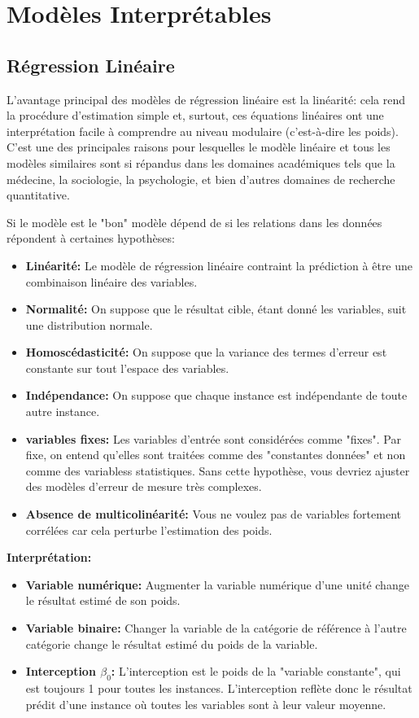 \section{Modèles Interprétables}

\subsection{Régression Linéaire}

L'avantage principal des modèles de régression linéaire est la linéarité: cela rend la procédure d'estimation simple et, surtout, ces équations linéaires ont une interprétation facile à comprendre au niveau modulaire (c'est-à-dire les poids). C'est une des principales raisons pour lesquelles le modèle linéaire et tous les modèles similaires sont si répandus dans les domaines académiques tels que la médecine, la sociologie, la psychologie, et bien d'autres domaines de recherche quantitative.

Si le modèle est le "bon" modèle dépend de si les relations dans les données répondent à certaines hypothèses:

\begin{itemize}
    \item \textbf{Linéarité:} Le modèle de régression linéaire contraint la prédiction à être une combinaison linéaire des variables.
    \item \textbf{Normalité:} On suppose que le résultat cible, étant donné les variables, suit une distribution normale.
    \item \textbf{Homoscédasticité:} On suppose que la variance des termes d'erreur est constante sur tout l'espace des variables.
    \item \textbf{Indépendance:} On suppose que chaque instance est indépendante de toute autre instance.
    \item \textbf{variables fixes:} Les variables d'entrée sont considérées comme "fixes". Par fixe, on entend qu'elles sont traitées comme des "constantes données" et non comme des variabless statistiques. Sans cette hypothèse, vous devriez ajuster des modèles d'erreur de mesure très complexes.
    \item \textbf{Absence de multicolinéarité:} Vous ne voulez pas de variables fortement corrélées car cela perturbe l'estimation des poids.
\end{itemize}

\textbf{Interprétation:}

\begin{itemize}
    \item \textbf{Variable numérique:} Augmenter la variable numérique d'une unité change le résultat estimé de son poids.
    \item \textbf{Variable binaire:} Changer la variable de la catégorie de référence à l'autre catégorie change le résultat estimé du poids de la variable.
    \item \textbf{Interception \( \beta_0 \):} L'interception est le poids de la "variable constante", qui est toujours 1 pour toutes les instances. L'interception reflète donc le résultat prédit d'une instance où toutes les variables sont à leur valeur moyenne.
\end{itemize}

